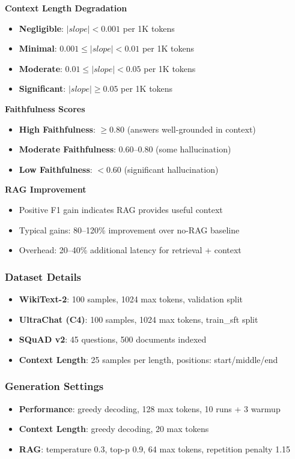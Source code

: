 \textbf{Context Length Degradation}
\begin{itemize}
    \item \textbf{Negligible}: $|slope| < 0.001$ per 1K tokens
    \item \textbf{Minimal}: $0.001 \leq |slope| < 0.01$ per 1K tokens
    \item \textbf{Moderate}: $0.01 \leq |slope| < 0.05$ per 1K tokens
    \item \textbf{Significant}: $|slope| \geq 0.05$ per 1K tokens
\end{itemize}

\textbf{Faithfulness Scores}
\begin{itemize}
    \item \textbf{High Faithfulness}: $\geq 0.80$ (answers well-grounded in context)
    \item \textbf{Moderate Faithfulness}: $0.60$--$0.80$ (some hallucination)
    \item \textbf{Low Faithfulness}: $< 0.60$ (significant hallucination)
\end{itemize}

\textbf{RAG Improvement}
\begin{itemize}
    \item Positive F1 gain indicates RAG provides useful context
    \item Typical gains: 80--120\% improvement over no-RAG baseline
    \item Overhead: 20--40\% additional latency for retrieval + context
\end{itemize}

\subsubsection*{Dataset Details}

\begin{itemize}
    \item \textbf{WikiText-2}: 100 samples, 1024 max tokens, validation split
    \item \textbf{UltraChat (C4)}: 100 samples, 1024 max tokens, train\_sft split
    \item \textbf{SQuAD v2}: 45 questions, 500 documents indexed
    \item \textbf{Context Length}: 25 samples per length, positions: start/middle/end
\end{itemize}

\subsubsection*{Generation Settings}

\begin{itemize}
    \item \textbf{Performance}: greedy decoding, 128 max tokens, 10 runs + 3 warmup
    \item \textbf{Context Length}: greedy decoding, 20 max tokens
    \item \textbf{RAG}: temperature 0.3, top-p 0.9, 64 max tokens, repetition penalty 1.15
\end{itemize}